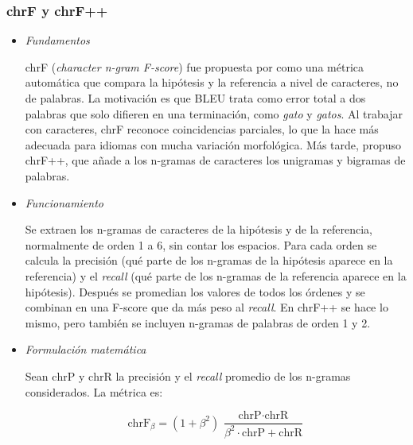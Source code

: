 \subsubsection{chrF y chrF++}
\label{par:chrf}
\vspace{-0.1cm}
\begin{itemize}
\item \textit{Fundamentos} \\
\vspace{-0.5cm}
 
chrF (\textit{character n-gram F-score}) fue propuesta por \citet{popovic2015chrf} como una métrica automática que compara la hipótesis y la referencia a nivel de caracteres, no de palabras. La motivación es que BLEU trata como error total a dos palabras que solo difieren en una terminación, como \textit{gato} y \textit{gatos}. Al trabajar con caracteres, chrF reconoce coincidencias parciales, lo que la hace más adecuada para idiomas con mucha variación morfológica. Más tarde, \citet{popovic2017chrfpp} propuso chrF++, que añade a los n-gramas de caracteres los unigramas y bigramas de palabras.
 
\item \textit{Funcionamiento} \\
\vspace{-0.5cm}
 
Se extraen los n-gramas de caracteres de la hipótesis y de la referencia, normalmente de orden 1 a 6, sin contar los espacios. Para cada orden se calcula la precisión (qué parte de los n-gramas de la hipótesis aparece en la referencia) y el \textit{recall} (qué parte de los n-gramas de la referencia aparece en la hipótesis). Después se promedian los valores de todos los órdenes y se combinan en una F-score que da más peso al \textit{recall}. En chrF++ se hace lo mismo, pero también se incluyen n-gramas de palabras de orden 1 y 2.
 
\item \textit{Formulación matemática} \\
\vspace{-0.5cm}
 
Sean $\text{chrP}$ y $\text{chrR}$ la precisión y el \textit{recall} promedio de los n-gramas considerados. La métrica es:
 
\begin{equation}
\text{chrF}_{\beta} = (1+\beta^2)\,\frac{\text{chrP} \cdot \text{chrR}}{\beta^2 \cdot \text{chrP} + \text{chrR}}
\end{equation}
 

\end{itemize}

